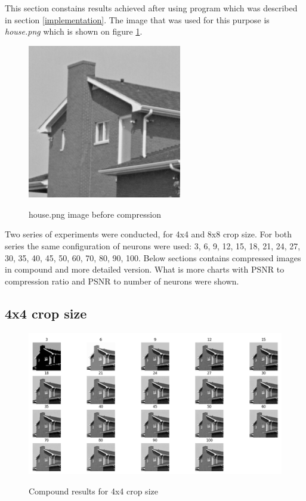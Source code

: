 \documentclass[../IDP_Task5_Karwowski_Kowalewski.tex]{subfiles}
\begin{document}
 {

    This section constains results achieved after using program which was described in
    section \ref{implementation}. The image that was used for this purpose is
    \emph{house.png} which is shown on figure \ref{fig:house}.

    \begin{figure}[!htbp]
        \centering
        \includegraphics[width=0.6\textwidth]{img/kowalewski/house.png}
        \label{fig:house}
        \caption{house.png image before compression}
    \end{figure}
    \FloatBarrier

    Two series of experiments were conducted, for 4x4 and 8x8 crop size. For both
    series the same configuration of neurons were used:
    3, 6, 9, 12, 15, 18, 21, 24, 27, 30, 35, 40, 45, 50, 60, 70, 80, 90, 100. Below
    sections contains compressed images in compound and more detailed version. What is
    more charts with PSNR to compression ratio and PSNR to number of neurons were shown.

    \subsection{4x4 crop size} \label{kowalewski_results_4x4} {

        \begin{figure}[!htbp]
            \centering
            \includegraphics[width=1.2\textwidth]{img/kowalewski/compound_4.png}
            \label{fig:compound_4}
            \caption{Compound results for 4x4 crop size}
        \end{figure}

}}
\end{document}
